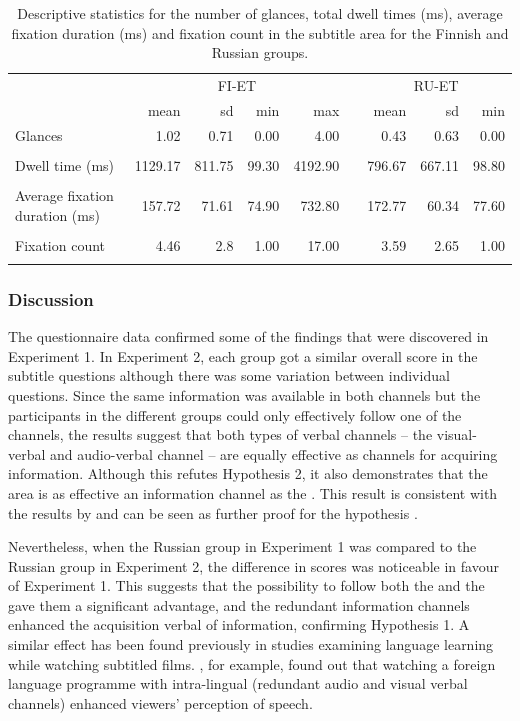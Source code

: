 \documentclass[output=paper]{langsci/langscibook}
\begin{document}
\begin{table}[t]
\small
\begin{tabularx}{\textwidth}{Xrrrrcrrr} 
\lsptoprule
& \multicolumn{4}{c}{ FI-ET} && \multicolumn{3}{c}{ RU-ET}\\
				& mean & sd & min & max && mean & sd & min\\
\midrule
{ Glances} 			& 1.02 	  & 0.71   & 0.00 & 4.00     && 0.43   & 0.63   & 0.00\\ \\
{ Dwell time (ms)} 		& 1129.17 & 811.75 & 99.30 & 4192.90 && 796.67 & 667.11 & 98.80\\ \\
{ Average \newline fixation duration (ms)}	& 157.72  & 71.61  & 74.90 & 732.80  && 172.77 & 60.34  & 77.60\\ \\
{ Fixation count} 		& 4.46    & 2.8    & 1.00  & 17.00   && 3.59   & 2.65   & 1.00\\  
\lspbottomrule
\end{tabularx}
\caption{Descriptive statistics for the number of glances, total dwell times (ms), average fixation duration (ms) and fixation count in the subtitle area for the Finnish and Russian groups.}
\label{lang:tab:1}
\end{table}

\subsubsection{Discussion}

The questionnaire data confirmed some of the findings that were discovered in Experiment 1. In Experiment 2, each group got a similar overall score in the subtitle questions although there was some variation between individual questions. Since the same information was available in both channels but the participants in the different groups could only effectively follow one of the channels, the results suggest that both types of verbal channels -- the visual-verbal and audio-verbal channel -- are equally effective as channels for acquiring information. Although this refutes Hypothesis 2, it also demonstrates that the  area is as effective an information channel as the . This result is consistent with the results by \citet{Perego2010} and can be seen as further proof for the  hypothesis \citep{dydewalle1987}. 
 
\newpage 
Nevertheless, when the Russian group in Experiment 1 was compared to the Russian group in Experiment 2, the difference in scores was noticeable in favour of Experiment 1. This suggests that the possibility to follow both the  and the  gave them a significant advantage, and the redundant information channels enhanced the acquisition verbal of information, confirming Hypothesis 1. A similar effect has been found previously in studies examining language learning while watching subtitled films. \citet{mitterer2009}, for example, found out that watching a foreign language programme with intra-lingual  (redundant audio and visual verbal channels) enhanced viewers' perception of speech. 
\end{document}
